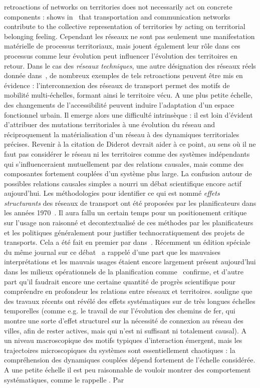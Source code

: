 {retroactions of networks on territories does not necessarily act on concrete components :  shows in~\cite{claval1987reseaux} that transportation and communication networks contribute to the collective representation of territories by acting on territorial belonging feeling.
}{
Cependant les réseaux ne sont pas seulement une manifestation matérielle de processus territoriaux, mais jouent également leur rôle dans ces processus comme leur évolution peut influencer l'évolution des territoires en retour. Dans le cas des \emph{réseaux techniques}, une autre désignation des réseaux réels donnée dans~\cite{offner1996reseaux}, de nombreux exemples de tels retroactions peuvent être mis en évidence : l'interconnexion des réseaux de transport permet des motifs de mobilité multi-échelles, formant ainsi le territoire vécu. A une plus petite échelle, des changements de l'accessibilité peuvent induire l'adaptation d'un espace fonctionnel urbain. Il emerge alors une difficulté intrinsèque : il est loin d'évident d'attribuer des mutations territoriales à une évolution du réseau and réciproquement la matérialisation d'un réseau à des dynamiques territoriales précises. Revenir à la citation de Diderot devrait aider à ce point, au sens où il ne faut pas considérer le réseau ni les territoires comme des systèmes indépendants qui s'influenceraient mutuellement par des relations causales, mais comme des composantes fortement couplées d'un système plus large. La confusion autour de possibles relations causales simples a nourri un débat scientifique encore actif aujourd'hui. Les méthodologies pour identifier ce qui est nommé \emph{effets structurants} des réseaux de transport ont été proposées par les planificateurs dans les années 1970~\cite{bonnafous1974detection,bonnafous1974methodologies}. Il aura fallu un certain temps pour un positionement critique sur l'usage non raisonné et decontextualisé de ces méthodes par les planificateurs et les politiques généralement pour justifier technocratiquement des projets de transports. Cela a été fait en premier par  dans~\cite{offner1993effets}. Récemment un édition spéciale du même journal sur ce débat~\cite{espacegeo2014effets} a rappelé d'une part que les mauvaises interprétations et les mauvais usages étaient encore largement présent aujourd'hui dans les milieux opérationnels de la planification comme~\cite{crozet:halshs-01094554} confirme, et d'autre part qu'il faudrait encore une certaine quantité de progrès scientifique pour compréendre en profondeur les relations entre réseaux et territoires.  souligne que des travaux récents ont révélé des effets systématiques sur de très longues échelles temporelles (comme e.g. le travail de  sur l'évolution des chemins de fer, qui montre une sorte d'effet structurel sur la nécessité de connexion au réseau des villes, afin de rester actives, mais qui n'est ni suffisant ni totalement causal). A un niveau macroscopique des motifs typiques d'interaction émergent, mais les trajectoires microscopiques du systèmes sont essentiellement chaotiques : la compréhension des dynamiques couplées dépend fortement de l'échelle considérée. A une petite échelle il est peu raisonnable de vouloir montrer des comportement systématiques, comme le rappelle . Par }

